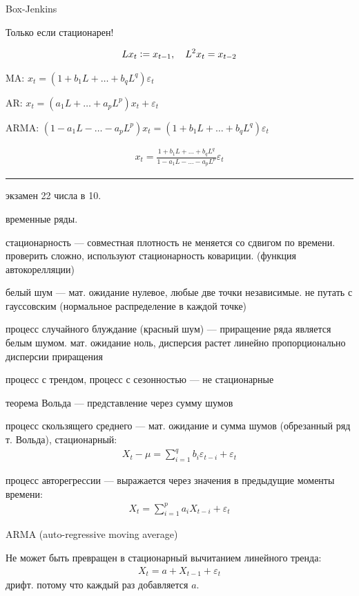 \documentclass{book}
\begin{document}
Box-Jenkins

Только если стационарен!

\newcommand{\defeq}{\vcentcolon=}
\begin{gather*}
  Lx_t \defeq x_{t-1},~~~L^2x_t=x_{t-2}
\end{gather*}

MA: $x_t=(1+b_1L+\dots+b_qL^q)\varepsilon_t$

AR: $x_t=(a_1L+\dots+a_pL^p)x_t+\varepsilon_t$

ARMA: $(1-a_1L-\dots-a_pL^p)x_t=(1+b_1L+\dots+b_qL^q)\varepsilon_t$

\begin{gather*}
  x_t=\frac{1+b_1L+\dots+b_qL^q}{1-a_1L-\dots-a_pL^p}\varepsilon_t
\end{gather*}

\hrule

экзамен 22 числа в 10.

временные ряды.

стационарность --- совместная плотность не меняется со сдвигом по времени. проверить сложно, используют стационарность ковариции. (функция автокорелляции)

белый шум --- мат. ожидание нулевое, любые две точки независимые. не путать с гауссовским (нормальное распределение в каждой точке)

процесс случайного блуждание (красный шум) --- приращение ряда является белым шумом. мат. ожидание ноль, дисперсия растет линейно пропорционально дисперсии приращения

процесс с трендом, процесс с сезонностью --- не стационарные

теорема Вольда --- представление через сумму шумов

процесс скользящего среднего --- мат. ожидание и сумма шумов (обрезанный ряд т. Вольда), стационарный:
\begin{gather*}
  X_t-\mu=\sum_{i=1}^{q} {b_i\varepsilon_{t-i}}+\varepsilon_t
\end{gather*}

процесс авторегрессии --- выражается через значения в предыдущие моменты времени:
\begin{gather*}
  X_t=\sum_{i=1}^{p} {a_iX_{t-i}}+\varepsilon_t
\end{gather*}

ARMA (auto-regressive moving average)

Не может быть превращен в стационарный вычитанием линейного тренда:
\begin{gather*}
  X_t=a+X_{t-1}+\varepsilon_t
\end{gather*}
дрифт. потому что каждый раз добавляется $a$.
\end{document}

